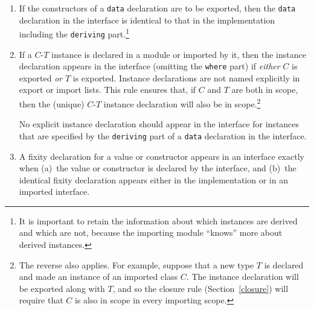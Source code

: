 \begin{enumerate}
\item
If the constructors of a \mbox{\tt data} declaration are to be exported, then
the \mbox{\tt data} declaration in the interface is identical to that in the
implementation including the \mbox{\tt deriving} part.\footnote{ It is important
to retain the information about which instances are derived and which
are not, because the importing module ``knows'' more about derived
instances.}

\item
If a $C$-$T$ instance is declared in a module or imported by it, then the
instance declaration appears in the interface (omitting the \mbox{\tt where}
part) if {\em either} $C$ is exported {\em or} $T$ is exported.
Instance declarations are not named explicitly in export or
import lists.  This rule ensures that, if $C$ and $T$ are both in
scope, then the (unique) $C$-$T$ instance declaration will also be in
scope.\footnote{The reverse also applies.  For example,
suppose that a new type $T$ is declared and made an instance of an
imported class $C$.  The instance declaration will be exported along
with $T$, and so the closure rule (Section~\ref{closure}) will require
that $C$ is also in scope in every importing scope.}

No explicit instance declaration should appear in the interface for
instances that are specified by the \mbox{\tt deriving} part of a \mbox{\tt data}
declaration in the interface.

\item
A fixity declaration for a value or constructor appears in an
interface exactly when (a)~the value or constructor is declared by the
interface, and (b)~the identical fixity declaration appears either in
the implementation or in an imported interface.
\end{enumerate}

